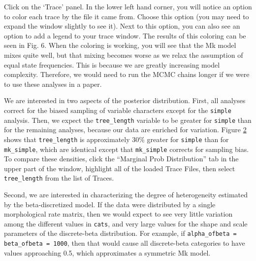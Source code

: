 Click on the `Trace' panel.
In the lower left hand corner, you will notice an option to color each trace by the file it came from.
Choose this option (you may need to expand the window slightly to see it).
Next to this option, you can also see an option to add a legend to your trace window.
The results of this coloring can be seen in Fig. 6.
When the coloring is working, you will see that the Mk model mixes quite well, but that mixing becomes worse as we relax the assumption of equal state frequencies.
This is because we are greatly increasing model complexity.
Therefore, we would need to run the MCMC chains longer if we were to use these analyses in a paper. \par

\begin{figure}[h!]
\label{fig:module-gm}
\end{figure}


We are interested in two aspects of the posterior distribution.
First, all analyses correct for the biased sampling of variable characters except for the {\tt simple} analysis.
Then, we expect the {\tt tree\_length} variable to be greater for {\tt simple} than for the remaining analyses, because our data are enriched for variation.
Figure \ref{fig:tracer_tree_length} shows that {\tt tree\_length} is approximately 30\% greater for {\tt simple} than for {\tt mk\_simple}, which are identical except that {\tt mk\_simple} corrects for sampling bias.
To compare these densities, click the ``Marginal Prob Distribution'' tab in the upper part of the window, highlight all of the loaded Trace Files, then select {\tt tree\_length} from the list of Traces.

\begin{figure}[h!]
\label{fig:tracer_tree_length}
\end{figure}

Second, we are interested in characterizing the degree of heterogeneity estimated by the beta-discretized model.
If the data were distributed by a single morphological rate matrix, then we would expect to see very little variation among the different values in {\tt cats}, and very large values for the shape and scale parameters of the discrete-beta distribution.
For example, if {\tt alpha\_ofbeta = beta\_ofbeta = 1000}, then that would cause all discrete-beta categories to have values approaching 0.5, which approximates a symmetric Mk model.

